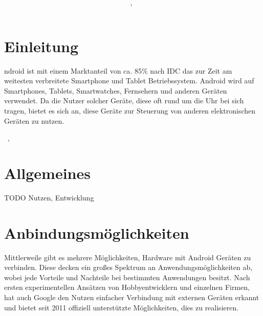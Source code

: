 \documentclass[12pt,journal,compsoc]{IEEEtran}
\begin{document}
\title{\paperTitle \\ \paperSubTitle }
\author{\paperAuthor,~}%



\maketitle

\section{Einleitung}


ndroid ist mit einem Marktanteil von ca. 85\% nach IDC das zur Zeit am weitesten verbreitete Smartphone und Tablet Betriebssystem.\cite{marketshare}
Android wird auf Smartphones, Tablets, Smartwatches, Fernsehern und anderen Geräten verwendet.
Da die Nutzer solcher Geräte, diese oft rund um die Uhr bei sich tragen, bietet es sich an, diese Geräte zur Steuerung von anderen elektronischen Geräten zu nutzen.





\hfill{\the\day~\Monat, \the\year  }

\section{Allgemeines}
TODO Nutzen, Entwicklung

\section{Anbindungsmöglichkeiten}
Mittlerweile gibt es mehrere Möglichkeiten, Hardware mit Android Geräten zu verbinden. 
Diese decken ein großes Spektrum an Anwendungsmöglichkeiten ab, wobei jede Vorteile und Nachteile bei bestimmten Anwendungen besitzt.
Nach ersten experimentellen Ansätzen von Hobbyentwicklern und einzelnen Firmen, hat auch Google den Nutzen einfacher Verbindung mit externen Geräten 
erkannt und bietet seit 2011 offiziell unterstützte Möglichkeiten, dies zu realisieren. 
\end{document}

